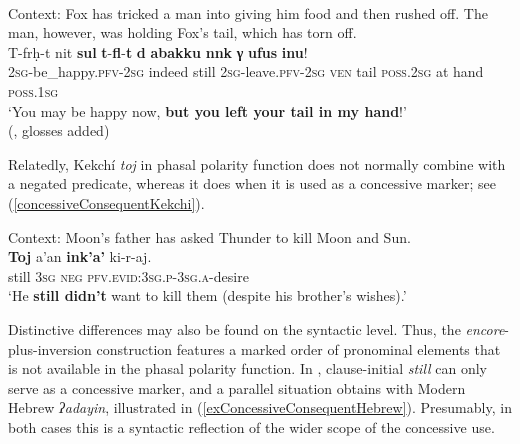 \begin{exe}
	\ex {}\label{concessiveConsequentTashelhyit}\\
	Context: Fox has tricked a man into giving him food and then rushed off. The man, however, was holding Fox’s tail, which has torn off.\\
	\gll T-frḥ-t nit \textbf{sul} \textbf{t}-\textbf{fl}-\textbf{t} \textbf{d} \textbf{abakku} \textbf{nnk} \textbf{γ} \textbf{ufus} \textbf{inu}!\\
	2\textsc{sg}-be\_happy.\textsc{pfv}-2\textsc{sg} indeed still 2\textsc{sg}-leave.\textsc{pfv}-2\textsc{sg} \textsc{ven} tail \textsc{poss}.2\textsc{sg} at hand \textsc{poss}.1\textsc{sg}\\
	\glt \lq You may be happy now, \textbf{but you left your tail in my hand}!'\\ (\cite[82]{Stroomer2001}, glosses added)
\end{exe}

Relatedly, Kekchí \textit{toj} in phasal polarity function does not normally combine with a negated predicate, whereas it does when it is used as a concessive marker; see (\ref{concessiveConsequentKekchi}).

\begin{exe}
	\ex\label{concessiveConsequentKekchi}
	Context: Moon's father has asked Thunder to kill Moon and Sun.\\
	\gll \textbf{Toj} a'an \textbf{ink'a'} ki-r-aj.\\
	still 3\textsc{sg} \textsc{neg} \textsc{pfv}.\textsc{evid}:3\textsc{sg}.\textsc{p}-3\textsc{sg}.\textsc{a}-desire\\
	\glt \lq He \textbf{still didn't} want to kill them (despite his brother's wishes).' \parencite[462–463]{Kockelman2020}
\end{exe}

Distinctive differences may also be found on the syntactic level. Thus, the  \textit{encore}-plus-inversion construction features a marked order of pronominal elements that is not available in the phasal polarity function. In , clause-initial \textit{still} can only serve as a concessive marker, and a parallel situation obtains with Modern Hebrew \textit{ʔadayin}, illustrated in (\ref{exConcessiveConsequentHebrew}). Presumably, in both cases this is a syntactic reflection of the wider scope of the concessive use.
 
